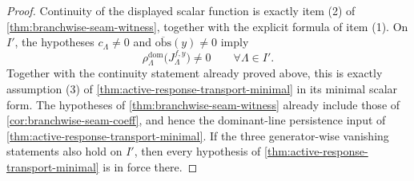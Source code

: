 \documentclass[11pt]{article}
\begin{document}
\begin{proof}
Continuity of the displayed scalar function is exactly item (2) of
\cref{thm:branchwise-seam-witness}, together with the explicit formula of item (1).
On \(I'\), the hypotheses
\(
c_\Lambda\neq 0
\)
and
\(
\overline{\mathrm{obs}}(y)\neq 0
\)
imply
\[
\rho^{\mathrm{dom}}_{\Lambda}\!\big(J^{f,y}_{\Lambda}\big)\neq 0
\qquad
\forall \Lambda\in I'.
\]
Together with the continuity statement already proved above, this is exactly assumption
\textup{(3)} of \cref{thm:active-response-transport-minimal} in its minimal scalar form.
The hypotheses of \cref{thm:branchwise-seam-witness} already include those of
\cref{cor:branchwise-seam-coeff}, and hence the dominant-line persistence input of
\cref{thm:active-response-transport-minimal}.
If the three generator-wise vanishing statements also hold on \(I'\), then every hypothesis of
\cref{thm:active-response-transport-minimal} is in force there.
\end{proof}
\end{document}
